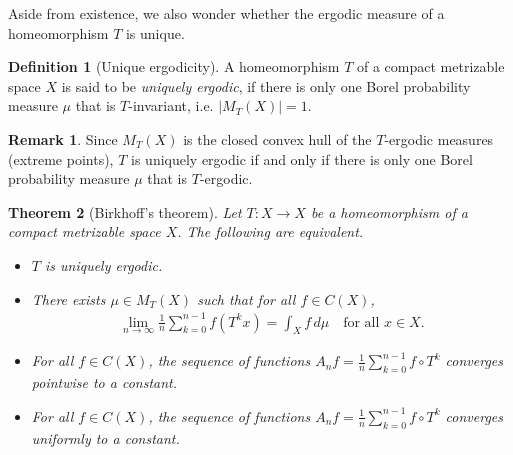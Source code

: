 \documentclass{article}
\numberwithin{equation}{section}
\theoremstyle{plain}
\newtheorem{theorem}{Theorem}[section]
\theoremstyle{definition}
\newtheorem{definition}[theorem]{Definition}
\newtheorem*{remark}{Remark}
\begin{document}
Aside from existence, we also wonder whether the ergodic measure of a homeomorphism $T$ is unique.
\begin{definition}[Unique ergodicity]
A homeomorphism $T$ of a compact metrizable space $X$ is said to be \textit{uniquely ergodic}, if there is only one Borel probability measure $\mu$ that is $T$-invariant, i.e. $\vert M_T(X)\vert=1$.
\end{definition}
\begin{remark}
Since $M_T(X)$ is the closed convex hull of the $T$-ergodic measures (extreme points), $T$ is uniquely ergodic if and only if there is only one Borel probability measure $\mu$ that is $T$-ergodic.
\end{remark}
\begin{theorem}[Birkhoff's theorem]
Let $T:X\to X$ be a homeomorphism of a compact metrizable space $X$. The following are equivalent.
\begin{itemize}
	\item[(i)] $T$ is uniquely ergodic.
	\item[(ii)] There exists $\mu\in M_T(X)$ such that for all $f\in C(X)$,
	\begin{align}
		\lim_{n\to\infty}\frac{1}{n}\sum_{k=0}^{n-1}f(T^kx)=\int_X f\,d\mu\quad\text{for all $x\in X$.}\label{ergcontpwlimit}
	\end{align}
\item[(iii)] For all $f\in C(X)$, the sequence of functions $A_nf=\frac{1}{n}\sum_{k=0}^{n-1}f\circ T^k$ converges pointwise to a constant.
\item[(iv)] For all $f\in C(X)$, the sequence of functions $A_nf=\frac{1}{n}\sum_{k=0}^{n-1}f\circ T^k$ converges uniformly to a constant.
\end{itemize}
\end{theorem}
\end{document}
